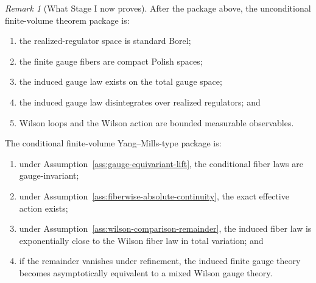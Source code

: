 \documentclass[11pt]{article}
\theoremstyle{definition}
\theoremstyle{remark}
\newtheorem{remark}[theorem]{Remark}
\begin{document}
\begin{remark}[What Stage I now proves]
\label{rem:what-stage1-proves}
After the package above, the unconditional finite-volume theorem package is:
\begin{enumerate}[leftmargin=1.5em,label=\textnormal{(\roman*)}]
\item the realized-regulator space is standard Borel;
\item the finite gauge fibers are compact Polish spaces;
\item the induced gauge law exists on the total gauge space;
\item the induced gauge law disintegrates over realized regulators; and
\item Wilson loops and the Wilson action are bounded measurable observables.
\end{enumerate}
The conditional finite-volume Yang--Mills-type package is:
\begin{enumerate}[leftmargin=1.5em,label=\textnormal{(\roman*)}]
\item under Assumption~\ref{ass:gauge-equivariant-lift}, the conditional fiber
laws are gauge-invariant;
\item under Assumption~\ref{ass:fiberwise-absolute-continuity}, the exact
effective action exists;
\item under Assumption~\ref{ass:wilson-comparison-remainder}, the induced fiber
law is exponentially close to the Wilson fiber law in total variation; and
\item if the remainder vanishes under refinement, the induced finite gauge
theory becomes asymptotically equivalent to a mixed Wilson gauge theory.
\end{enumerate}
\end{remark}
\end{document}
